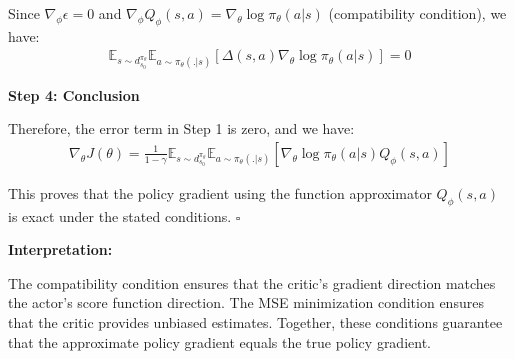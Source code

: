 Since $\nabla_\phi \epsilon = 0$ and $\nabla_\phi Q_\phi(s, a) = \nabla_\theta \log \pi_\theta (a|s)$ (compatibility condition), we have:
\begin{align}
\mathbb{E}_{s \sim d^{\pi_\theta}_{s_0}}\mathbb{E}_{a \sim \pi_\theta(.|s)} [\Delta(s,a) \nabla_\theta \log \pi_\theta (a|s)] = 0
\end{align}

\textbf{Step 4: Conclusion}

Therefore, the error term in Step 1 is zero, and we have:
\begin{align}
\nabla_\theta J(\theta) = \frac{1}{1-\gamma}\mathbb{E}_{s \sim d^{\pi_\theta}_{s_0}}\mathbb{E}_{a \sim \pi_\theta(.|s)} [\nabla_\theta \log \pi_\theta (a|s) Q_\phi (s, a)]
\end{align}

This proves that the policy gradient using the function approximator $Q_\phi(s,a)$ is exact under the stated conditions. $\square$

\textbf{Interpretation:}

The compatibility condition ensures that the critic's gradient direction matches the actor's score function direction. The MSE minimization condition ensures that the critic provides unbiased estimates. Together, these conditions guarantee that the approximate policy gradient equals the true policy gradient.